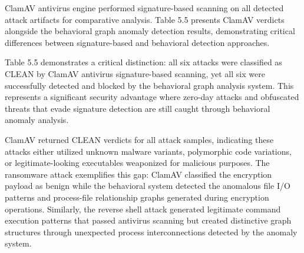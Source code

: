 ClamAV antivirus engine performed signature-based scanning on all detected attack artifacts for comparative analysis. Table 5.5 presents ClamAV verdicts alongside the behavioral graph anomaly detection results, demonstrating critical differences between signature-based and behavioral detection approaches.

\begin{table}[H]
\centering
{}
\caption{ClamAV Antivirus Verdicts vs Behavioral Detection for Attack Instances}
\label{tab:clamav_verdicts}
\end{table}

Table 5.5 demonstrates a critical distinction: all six attacks were classified as CLEAN by ClamAV antivirus signature-based scanning, yet all six were successfully detected and blocked by the behavioral graph analysis system. This represents a significant security advantage where zero-day attacks and obfuscated threats that evade signature detection are still caught through behavioral anomaly analysis.

ClamAV returned CLEAN verdicts for all attack samples, indicating these attacks either utilized unknown malware variants, polymorphic code variations, or legitimate-looking executables weaponized for malicious purposes. The ransomware attack exemplifies this gap: ClamAV classified the encryption payload as benign while the behavioral system detected the anomalous file I/O patterns and process-file relationship graphs generated during encryption operations. Similarly, the reverse shell attack generated legitimate command execution patterns that passed antivirus scanning but created distinctive graph structures through unexpected process interconnections detected by the anomaly system.

